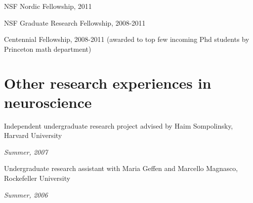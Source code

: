 \documentclass[letterpaper]{article}
\renewenvironment{itemize}{
  \begin{list}{}{
    \setlength{\leftmargin}{1.5em}
  }
}{
  \end{list}
}
\begin{document}
\begin{itemize}
\item NSF Nordic Fellowship, 2011 
\item NSF Graduate Research Fellowship, 2008-2011 
\item Centennial Fellowship, 2008-2011 (awarded to top few incoming Phd students by Princeton math department) 
\end{itemize}

\section*{Other research experiences in neuroscience}

\begin{itemize}

\item Independent undergraduate research project advised by Haim Sompolinsky, Harvard University 

\textit{Summer, 2007}

\item Undergraduate research assistant with  Maria Geffen and Marcello Magnasco, Rockefeller University

\textit{Summer, 2006}

\end{itemize}


\bigskip
\end{document}
